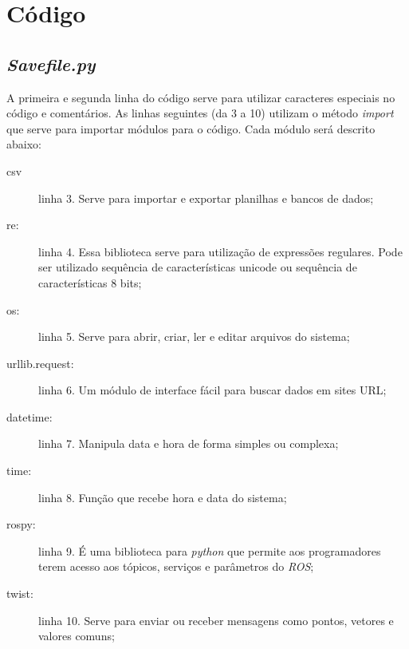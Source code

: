 \section{Código}
\label{codigo}

\subsection{\textit{Savefile.py}}
\label{sec:Savefile.py}

	\begin{figure}[H]
		\centering
	\end{figure}
	
A primeira e segunda linha do código serve para utilizar caracteres especiais no código e comentários. As linhas seguintes (da 3 a 10) utilizam o método \textit{import} que serve para importar módulos para o código. Cada módulo será descrito abaixo:
\begin{description}
    \item[csv] linha 3. Serve para importar e exportar planilhas e bancos de dados;
    \item[re:] linha 4. Essa biblioteca serve para utilização de expressões regulares. Pode ser utilizado sequência de características unicode ou sequência de características 8 bits;
    \item[os:] linha 5. Serve para abrir, criar, ler e editar arquivos do sistema;
    \item[urllib.request:] linha 6. Um módulo de interface fácil para buscar dados em sites URL;
    \item[datetime:] linha 7. Manipula data e hora de forma simples ou complexa;
    \item[time:] linha 8. Função que recebe hora e data do sistema;
    \item[rospy:] linha 9. É uma biblioteca para \textit{python} que permite aos programadores terem acesso aos tópicos, serviços e parâmetros do \textit{ROS};
    \item[twist:] linha 10. Serve para enviar ou receber mensagens como pontos, vetores e valores comuns;
\end{description}

